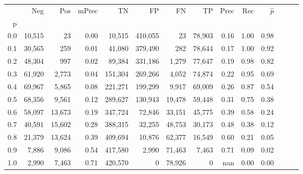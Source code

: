 \begin{tabular}{rrrrrrrrrrrrrr}
\toprule
{} &     Neg &     Pos & mPrec &       TN &       FP &      FN &      TP &  Prec &   Rec & $\hat{p}$ \\
p   &         &         &       &          &          &         &         &       &       &           \\
\midrule
0.0 &  10,515 &      23 &  0.00 &   10,515 &  410,055 &      23 &  78,903 &  0.16 &  1.00 &      0.98 \\
0.1 &  30,565 &     259 &  0.01 &   41,080 &  379,490 &     282 &  78,644 &  0.17 &  1.00 &      0.92 \\
0.2 &  48,304 &     997 &  0.02 &   89,384 &  331,186 &   1,279 &  77,647 &  0.19 &  0.98 &      0.82 \\
0.3 &  61,920 &   2,773 &  0.04 &  151,304 &  269,266 &   4,052 &  74,874 &  0.22 &  0.95 &      0.69 \\
0.4 &  69,967 &   5,865 &  0.08 &  221,271 &  199,299 &   9,917 &  69,009 &  0.26 &  0.87 &      0.54 \\
0.5 &  68,356 &   9,561 &  0.12 &  289,627 &  130,943 &  19,478 &  59,448 &  0.31 &  0.75 &      0.38 \\
0.6 &  58,097 &  13,673 &  0.19 &  347,724 &   72,846 &  33,151 &  45,775 &  0.39 &  0.58 &      0.24 \\
0.7 &  40,591 &  15,602 &  0.28 &  388,315 &   32,255 &  48,753 &  30,173 &  0.48 &  0.38 &      0.12 \\
0.8 &  21,379 &  13,624 &  0.39 &  409,694 &   10,876 &  62,377 &  16,549 &  0.60 &  0.21 &      0.05 \\
0.9 &   7,886 &   9,086 &  0.54 &  417,580 &    2,990 &  71,463 &   7,463 &  0.71 &  0.09 &      0.02 \\
1.0 &   2,990 &   7,463 &  0.71 &  420,570 &        0 &  78,926 &       0 &   nan &  0.00 &      0.00 \\
\bottomrule
\end{tabular}
